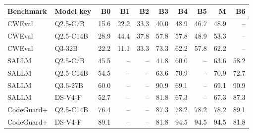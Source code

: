 \begin{tabular}{llrrrrrrrr}
\toprule
Benchmark & Model key & B0 & B1 & B2 & B3 & B4 & B5 & M & B6 \\
\midrule
CWEval & Q2.5-C7B & 15.6 & 22.2 & 33.3 & 40.0 & 48.9 & 46.7 & 48.9 & -- \\
CWEval & Q2.5-C14B & 28.9 & 44.4 & 37.8 & 57.8 & 57.8 & 48.9 & 53.3 & -- \\
CWEval & Q3-32B & 22.2 & 11.1 & 33.3 & 73.3 & 62.2 & 57.8 & 62.2 & -- \\
SALLM & Q2.5-C7B & 45.5 & -- & -- & 41.8 & 60.0 & -- & 63.6 & 58.2 \\
SALLM & Q2.5-C14B & 54.5 & -- & -- & 63.6 & 70.9 & -- & 70.9 & 72.7 \\
SALLM & Q3.6-27B & 60.0 & -- & -- & 90.9 & 69.1 & -- & 69.1 & 90.9 \\
SALLM & DS-V4-F & 52.7 & -- & -- & 81.8 & 67.3 & -- & 67.3 & 87.3 \\
CodeGuard+ & Q2.5-C14B & 76.4 & -- & -- & 87.3 & 78.2 & 78.2 & 78.2 & 89.1 \\
CodeGuard+ & DS-V4-F & 89.1 & -- & -- & 81.8 & 94.5 & 94.5 & 94.5 & 81.8 \\
\bottomrule
\end{tabular}
